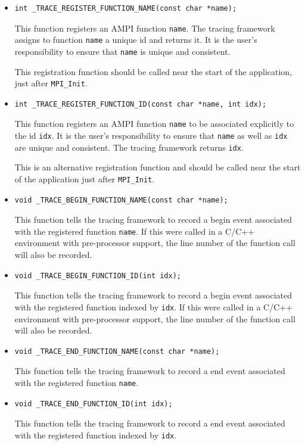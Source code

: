 \documentclass[10pt]{report}
\begin{document}
\begin{itemize}
\item 
\begin{verbatim}
int _TRACE_REGISTER_FUNCTION_NAME(const char *name);
\end{verbatim}
This function registers an AMPI function {\tt name}. The tracing
framework assigns to function {\tt name} a unique id and returns
it. It is the user's responsibility to ensure that {\tt name} is
unique and consistent.

This registration function should be called near the start of the
application, just after {\tt MPI\_Init}.

\item
\begin{verbatim}
int _TRACE_REGISTER_FUNCTION_ID(const char *name, int idx);
\end{verbatim}
This function registers an AMPI function {\tt name} to be associated
explicitly to the id {\tt idx}. It is the user's responsibility to 
ensure that {\tt name} as well as {\tt idx} are unique and consistent.
The tracing framework returns {\tt idx}.

This is an alternative registration function and should be called near
the start of the application just after {\tt MPI\_Init}.

\item
\begin{verbatim}
void _TRACE_BEGIN_FUNCTION_NAME(const char *name);
\end{verbatim}
This function tells the tracing framework to record a begin event
associated with the registered function {\tt name}. If this were called
in a C/C++ environment with pre-processor support, the line number of
the function call will also be recorded.

\item
\begin{verbatim}
void _TRACE_BEGIN_FUNCTION_ID(int idx);
\end{verbatim}
This function tells the tracing framework to record a begin event
associated with the registered function indexed by {\tt idx}. If this were
called in a C/C++ environment with pre-processor support, the line number
of the function call will also be recorded.

\item
\begin{verbatim}
void _TRACE_END_FUNCTION_NAME(const char *name);
\end{verbatim}
This function tells the tracing framework to record a end event
associated with the registered function {\tt name}.

\item
\begin{verbatim}
void _TRACE_END_FUNCTION_ID(int idx);
\end{verbatim}
This function tells the tracing framework to record a end event
associated with the registered function indexed by {\tt idx}.

\end{itemize}
\end{document}
